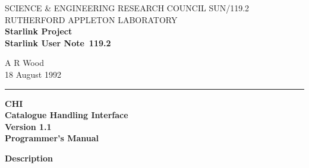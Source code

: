 \pagestyle{myheadings}

\newcommand{\stardoccategory}  {Starlink User Note}
\newcommand{\stardocinitials}  {SUN}
\newcommand{\stardocauthors}   {A R Wood}
\newcommand{\stardocdate}      {18 August 1992}
\newcommand{\stardoctitle}     {CHI --- Catalogue Handling Interface}
\newcommand{\stardoctita}      {CHI}
\newcommand{\stardoctitb}      {Catalogue Handling Interface}
\newcommand{\stardocnumber}    {119.2}
\newcommand{\stardocversion}   {Version 1.1}
\newcommand{\stardocmanual}    {Programmer's Manual}

\newcommand{\stardocname}{\stardocinitials /\stardocnumber}
\markright{\stardocname}

\setlength{\textwidth}{160mm}
\setlength{\textheight}{230mm}
\setlength{\topmargin}{-2mm}
\setlength{\oddsidemargin}{0mm}
\setlength{\evensidemargin}{0mm}
\setlength{\parindent}{0mm}
\setlength{\parskip}{\medskipamount}
\setlength{\unitlength}{1mm}

\renewcommand{\_}{{\tt\char'137}}
\renewcommand{\thepage}{\roman{page}}



\thispagestyle{empty}
SCIENCE \& ENGINEERING RESEARCH COUNCIL \hfill \stardocname\\
RUTHERFORD APPLETON LABORATORY\\
{\large\bf Starlink Project\\}
{\large\bf \stardoccategory\ \stardocnumber}
\begin{flushright}
\stardocauthors\\
\stardocdate
\end{flushright}
\vspace{-4mm}
\rule{\textwidth}{0.5mm}
\vspace{5mm}
\begin{center}
{\Huge\bf  \stardoctita \\ [2.5ex]}
{\Huge\bf  \stardoctitb \\ [2.5ex]}
{\LARGE\bf \stardocversion \\ [4ex]}
{\Huge\bf  \stardocmanual}
\end{center}
\vspace{20mm}

\begin{center}
{\Large\bf Description}
\end{center}


